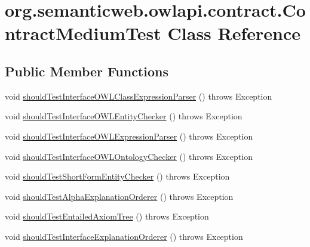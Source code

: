 \hypertarget{classorg_1_1semanticweb_1_1owlapi_1_1contract_1_1_contract_medium_test}{\section{org.\-semanticweb.\-owlapi.\-contract.\-Contract\-Medium\-Test Class Reference}
\label{classorg_1_1semanticweb_1_1owlapi_1_1contract_1_1_contract_medium_test}
}
\subsection*{Public Member Functions}
\begin{DoxyCompactItemize}
\item 
void \hyperlink{classorg_1_1semanticweb_1_1owlapi_1_1contract_1_1_contract_medium_test_aa38fb284115d747b6624b583cfb073ef}{should\-Test\-Interface\-O\-W\-L\-Class\-Expression\-Parser} ()  throws Exception 
\item 
void \hyperlink{classorg_1_1semanticweb_1_1owlapi_1_1contract_1_1_contract_medium_test_a532e7bcbd5347cd56ec916b18d5aecb6}{should\-Test\-Interface\-O\-W\-L\-Entity\-Checker} ()  throws Exception 
\item 
void \hyperlink{classorg_1_1semanticweb_1_1owlapi_1_1contract_1_1_contract_medium_test_a4e4807a72c63d688027070ebf9921576}{should\-Test\-Interface\-O\-W\-L\-Expression\-Parser} ()  throws Exception 
\item 
void \hyperlink{classorg_1_1semanticweb_1_1owlapi_1_1contract_1_1_contract_medium_test_ada018ac3f72f8f3feb662ee03149d167}{should\-Test\-Interface\-O\-W\-L\-Ontology\-Checker} ()  throws Exception 
\item 
void \hyperlink{classorg_1_1semanticweb_1_1owlapi_1_1contract_1_1_contract_medium_test_a1d27c9b71d91bc2959b9fa95ecef81d2}{should\-Test\-Short\-Form\-Entity\-Checker} ()  throws Exception 
\item 
void \hyperlink{classorg_1_1semanticweb_1_1owlapi_1_1contract_1_1_contract_medium_test_adec19f9751dc4ef7cefa47e037e6fb25}{should\-Test\-Alpha\-Explanation\-Orderer} ()  throws Exception 
\item 
void \hyperlink{classorg_1_1semanticweb_1_1owlapi_1_1contract_1_1_contract_medium_test_a8845f8a97dcba0ce84598f525fdbc13e}{should\-Test\-Entailed\-Axiom\-Tree} ()  throws Exception 
\item 
void \hyperlink{classorg_1_1semanticweb_1_1owlapi_1_1contract_1_1_contract_medium_test_a3df9b7044de9241b0406220374f2bbec}{should\-Test\-Interface\-Explanation\-Orderer} ()  throws Exception 

\end{DoxyCompactItemize}

